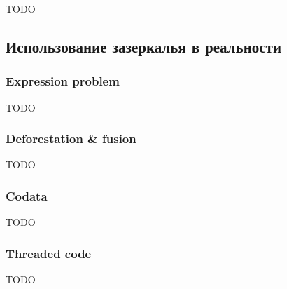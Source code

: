 TODO %


\subsection{Использование зазеркалья в реальности}

\subsubsection{Expression problem}



TODO %

\subsubsection{Deforestation \& fusion}








TODO %

\subsubsection{Codata}




TODO %

\subsubsection{Threaded code}

TODO %




